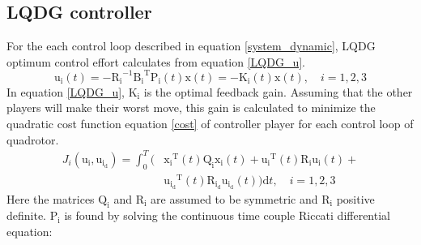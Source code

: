 \documentclass[conference]{IEEEtran}
\begin{document}
\subsection{LQDG controller}
For the each control loop described in equation \eqref{system_dynamic}, LQDG optimum control effort calculates from equation \eqref{LQDG_u}.
\begin{equation}\label{LQDG_u}
	\boldsymbol{\mathrm{u_i}}(t) = -\boldsymbol{\mathrm{R_{i}}}^{-1}\boldsymbol{\mathrm{B_i}}^\mathrm{T}\boldsymbol{\mathrm{P_{i}}}(t)\boldsymbol{\mathrm{x}}(t) = -\boldsymbol{\mathrm{K_{i}}}(t)\boldsymbol{\mathrm{x}}(t),\quad i = 1, 2, 3
\end{equation}
In equation \eqref{LQDG_u}, $\boldsymbol{\mathrm{K_{i}}}$ is the optimal feedback gain. Assuming that the other players will make their worst move, this gain is calculated to minimize the quadratic cost function equation \eqref{cost} of controller player for each control loop of quadrotor.
\begin{equation}\label{cost}
    \begin{split}
        J_i( \boldsymbol{\mathrm{u_i}},  \boldsymbol{\mathrm{u_{i_d}}}) = \int_{0}^{T}\biggl (&\boldsymbol{\mathrm{x_i}} ^\mathrm{T}(t) \boldsymbol{\mathrm{Q_i}} \boldsymbol{\mathrm{x_i}}(t)+
        \boldsymbol{\mathrm{u_i}} ^\mathrm{T}(t) \boldsymbol{\mathrm{R_{i}}} \boldsymbol{\mathrm{u_i}}(t)+\\
        &\boldsymbol{\mathrm{u_{i_d}}} ^\mathrm{T}(t)\boldsymbol{\mathrm{ R_{i_d} u_{i_d}}}(t)
        \biggl )\mathrm{d}t, \quad i = 1, 2, 3 
    \end{split} 
\end{equation}
Here the matrices $\boldsymbol{\mathrm{Q_i}}$ and  $\boldsymbol{\mathrm{R_{i}}}$ are assumed to be symmetric and $\boldsymbol{\mathrm{R_{i}}}$ positive definite.
$\boldsymbol{\mathrm{P_{i}}}$ is found by solving the continuous time couple Riccati differential equation:
\end{document}
